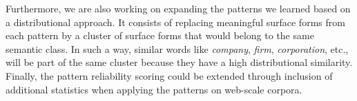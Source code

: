 \documentclass[output=paper]{langsci/langscibook}
\begin{document}
Furthermore, we are also working on expanding the patterns we learned based on a distributional approach. It consists of replacing meaningful surface forms from each pattern by a cluster of surface forms that would belong to the same semantic class. In such a way, similar words like \textit{company}, \textit{firm}, \textit{corporation}, etc., will be part of the same cluster because they have a high distributional similarity. Finally, the pattern reliability scoring could be extended through inclusion of additional statistics when applying the patterns on web-scale corpora.


\printbibliography[heading=subbibliography,notkeyword=this]
\end{document}
